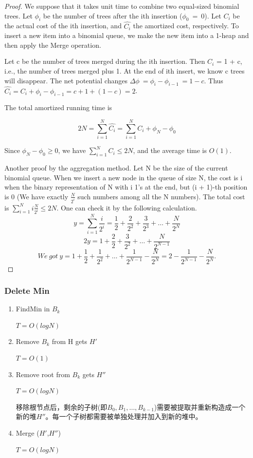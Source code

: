 \documentclass{article}
\begin{document}
\begin{proof}
    We suppose that it takes unit time to combine two equal-sized binomial trees. Let $\phi_i$ be the number of trees after the ith insertion ($\phi_0 \ = \ 0$).  Let $C_i$ be the actual cost of the ith insertion, and $\hat{C_i}$ the amortized cost, respectively. To insert a new item into a binomial queue, we make the new item into a 1-heap and then apply the Merge operation.\par
    Let c be the number of trees merged during the ith insertion. Then $C_i$ = 1 + c, i.e., the number of trees merged plus 1. At the end of ith insert, we know c trees will disappear. The net potential changes $\Delta \phi \ = \phi_i - \phi_{i-1} \ = 1 - c$. Thus $\hat{C_i} = C_i + \phi_i - \phi_{i-1} = c + 1 + (1 - c) = 2$.\par
    The total amortized running time is\par
    $$2N = \sum\limits_{i=1}^{N} \hat{C_i} = \sum_{i=1}^{N} C_i + \phi_N - \phi_0$$\par
    Since $\phi_N - \phi_0 \ge 0$, we have $\sum_{i=1}^{N} C_i \le 2N$, and the average time is $O(1)$.\par
    Another proof by the aggregation method. Let N be the size of the current binomial queue. When we insert a new node in the queue of size N, the cost is i when the binary representation of N with i 1's at the end, but (i + 1)-th position is 0 (We have exactly $\frac{N}{2^i}$ such numbers among all the N numbers). The total cost is $\sum\limits_{i=1}^{N} i \frac{N}{2^i} \le 2N$. One can check it by the following calculation.
    $$y = \sum\limits_{i=1}^{N} \frac{i}{2^i} = \frac{1}{2} + \frac{2}{2^2} + \frac{3}{2^3} + \dots + \frac{N}{2^N}$$
    $$2y = 1 + \frac{2}{2} + \frac{3}{2^2} + \dots + \frac{N}{2^{N-1}}$$
    $$We \ got \ y = 1 + \frac{1}{2} + \frac{1}{2^2} + \dots + \frac{1}{2^{N-1}} - \frac{N}{2^N} = 2 - \frac{1}{2^{N-1}} - \frac{N}{2^N}.$$    
\end{proof}

\subsubsection{Delete Min}
\begin{enumerate}
    \item FindMin in $B_k$\par
    $T = O(log N)$
    \item Remove $B_k$ from H gets $H'$\par
    $T = O(1)$
    \item Remove root from $B_k$ gets $H''$\par
    $T = O(log N)$\par
    移除根节点后，剩余的子树(即$B_0,B_1,\dots,B_{k-1}$)需要被提取并重新构造成一个新的堆$H''$。每一个子树都需要被单独处理并加入到新的堆中。
    \item Merge ($H'$,$H''$)\par
    $T = O(log N)$
\end{enumerate}
\end{document}
